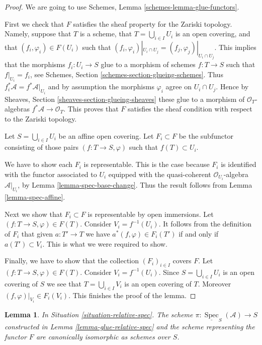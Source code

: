 \documentclass{stacks-project}
\theoremstyle{plain}
\newtheorem{lemma}[subsection]{Lemma}
\theoremstyle{definition}
\theoremstyle{remark}
\numberwithin{equation}{subsection}
\def\Spec{\mathop{\mathrm{Spec}}}
\begin{document}
\begin{proof}
We are going to use Schemes, Lemma \ref{schemes-lemma-glue-functors}.

\medskip\noindent
First we check that $F$ satisfies the sheaf property for the
Zariski topology. Namely, suppose that $T$ is a scheme,
that $T = \bigcup_{i \in I} U_i$ is an open covering,
and that $(f_i, \varphi_i) \in F(U_i)$ such that
$(f_i, \varphi_i)|_{U_i \cap U_j} = (f_j, \varphi_j)|_{U_i \cap U_j}$.
This implies that the morphisms $f_i : U_i \to S$
glue to a morphism of schemes $f : T \to S$ such that
$f|_{U_i} = f_i$, see Schemes, Section \ref{schemes-section-glueing-schemes}.
Thus $f_i^*\mathcal{A} = f^*\mathcal{A}|_{U_i}$ and by assumption the
morphisms $\varphi_i$ agree on $U_i \cap U_j$. Hence by Sheaves,
Section \ref{sheaves-section-glueing-sheaves} these glue to a
morphism of $\mathcal{O}_T$-algebras $f^*\mathcal{A} \to \mathcal{O}_T$.
This proves that $F$ satisfies the sheaf condition with respect to
the Zariski topology.

\medskip\noindent
Let $S = \bigcup_{i \in I} U_i$ be an affine open covering.
Let $F_i \subset F$ be the subfunctor consisting of
those pairs $(f : T \to S, \varphi)$ such that
$f(T) \subset U_i$.

\medskip\noindent
We have to show each $F_i$ is representable.
This is the case because $F_i$ is identified with
the functor associated to $U_i$ equipped with
the quasi-coherent $\mathcal{O}_{U_i}$-algebra $\mathcal{A}|_{U_i}$,
by Lemma \ref{lemma-spec-base-change}.
Thus the result follows from Lemma \ref{lemma-spec-affine}.

\medskip\noindent
Next we show that $F_i \subset F$ is representable by open immersions.
Let $(f : T \to S, \varphi) \in F(T)$. Consider $V_i = f^{-1}(U_i)$.
It follows from the definition of $F_i$ that given $a : T' \to T$
we have $a^*(f, \varphi) \in F_i(T')$ if and only if $a(T') \subset V_i$.
This is what we were required to show.

\medskip\noindent
Finally, we have to show that the collection $(F_i)_{i \in I}$
covers $F$. Let $(f : T \to S, \varphi) \in F(T)$.
Consider $V_i = f^{-1}(U_i)$. Since $S = \bigcup_{i \in I} U_i$
is an open covering of $S$ we see that $T = \bigcup_{i \in I} V_i$
is an open covering of $T$. Moreover $(f, \varphi)|_{V_i} \in F_i(V_i)$.
This finishes the proof of the lemma.
\end{proof}

\begin{lemma}
\label{lemma-glueing-gives-functor-spec}
In Situation \ref{situation-relative-spec}.
The scheme $\pi : \underline{\Spec}_S(\mathcal{A}) \to S$
constructed in Lemma \ref{lemma-glue-relative-spec}
and the scheme representing the functor $F$ are
canonically isomorphic as schemes over $S$.
\end{lemma}
\end{document}
